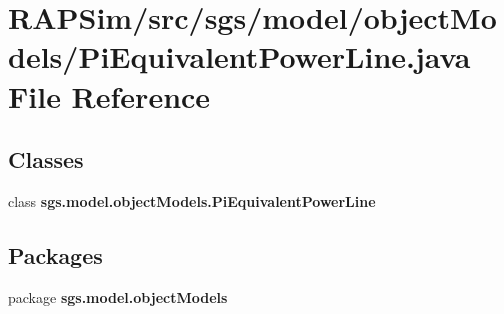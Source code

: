 \section{R\-A\-P\-Sim/src/sgs/model/object\-Models/\-Pi\-Equivalent\-Power\-Line.java File Reference}
\label{_pi_equivalent_power_line_8java}
\subsection*{Classes}
\begin{DoxyCompactItemize}
\item 
class {\bf sgs.\-model.\-object\-Models.\-Pi\-Equivalent\-Power\-Line}
\end{DoxyCompactItemize}
\subsection*{Packages}
\begin{DoxyCompactItemize}
\item 
package {\bf sgs.\-model.\-object\-Models}
\end{DoxyCompactItemize}
